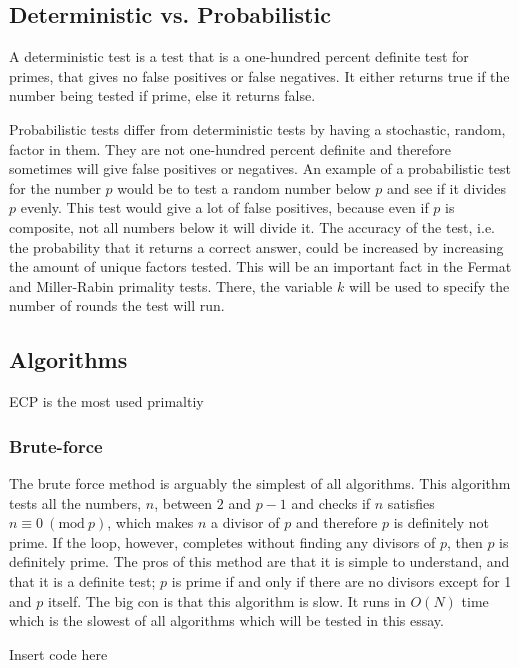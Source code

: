 \documentclass[main.tex]{subfiles}
\newcommand{\Mod}[1]{\ (\mathrm{mod}\ #1)}
\begin{document}
\subsection{Deterministic vs. Probabilistic}
A deterministic test is a test that is a one-hundred percent definite test for primes, that gives no false positives or false negatives. It either returns true if the number being tested if prime, else it returns false. 

Probabilistic tests differ from deterministic tests by having a stochastic, random, factor in them. They are not one-hundred percent definite and therefore sometimes will give false positives or negatives. An example of a probabilistic test for the number $p$ would be to test a random number below $p$ and see if it divides $p$ evenly. This test would give a lot of false positives, because even if $p$ is composite, not all numbers below it will divide it. The accuracy of the test, i.e. the probability that it returns a correct answer, could be increased by increasing the amount of unique factors tested. This will be an important fact in the Fermat and Miller-Rabin primality tests. There, the variable $k$ will be used to specify the number of rounds the test will run. 

\subsection{Algorithms}

ECP is the most used primaltiy

\subsubsection{Brute-force}
The brute force method is arguably the simplest of all algorithms. This algorithm tests all the numbers, $n$, between $2$ and $p-1$ and checks if $n$ satisfies $n \equiv 0 \Mod{p}$, which makes $n$ a divisor of $p$ and therefore $p$ is definitely not prime. If the loop, however, completes without finding any divisors of $p$, then $p$ is definitely prime. The pros of this method are that it is simple to understand, and that it is a definite test; $p$ is prime if and only if there are no divisors except for 1 and $p$ itself. The big con is that this algorithm is slow. It runs in $O(N)$ time which is the slowest of all algorithms which will be tested in this essay. 

\begin{python}
    Insert code here
\end{python}
\end{document}
